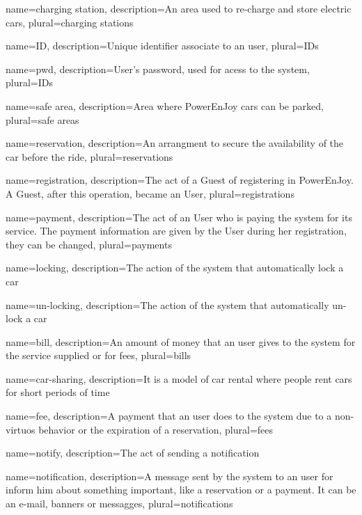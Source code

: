 {
  name={charging station},
  description={An area used to re-charge and store electric cars},
  plural={charging stations}
}

{
  name={ID},
  description={Unique identifier associate to an user},
  plural={IDs}
}

{
  name={pwd},
  description={User's password, used for acess to the system},
  plural={IDs}
}

{
  name={safe area},
  description={Area where PowerEnJoy cars can be parked},
  plural={safe areas}
}

{
  name={reservation},
  description={An arrangment to secure the availability of the car before the ride},
  plural={reservations}
}

{
	name={registration},
	description={The act of a Guest of registering in PowerEnJoy. A Guest, after this operation, became an User},
	plural={registrations}
}

{
	name={payment},
	description={The act of an User who is paying the system for its service. The payment information are given by the User during her \gls{registration}, they can be changed},
	plural={payments}
}

{
	name={locking},
	description={The action of the system that automatically lock a car}
}

{
	name={un-locking},
	description={The action of the system that automatically un-lock a car}
}

{
	name={bill},
	description={An amount of money that an user gives to the system for the service supplied or for fees},
	plural={bills}
}

{
	name={car-sharing},
	description={It is a model of car rental where people rent cars for short periods of time}
}

{
	name={fee},
	description={A payment that an user does to the system due to a non-virtuos behavior or the expiration of a reservation},
	plural={fees}
}

{
	name={notify},
	description={The act of sending a notification}
}

{
	name={notification},
	description={A message sent by the system to an user for inform him about something important, like a reservation or a payment. It can be an e-mail, banners or messagges},
	plural={notifications}
}


